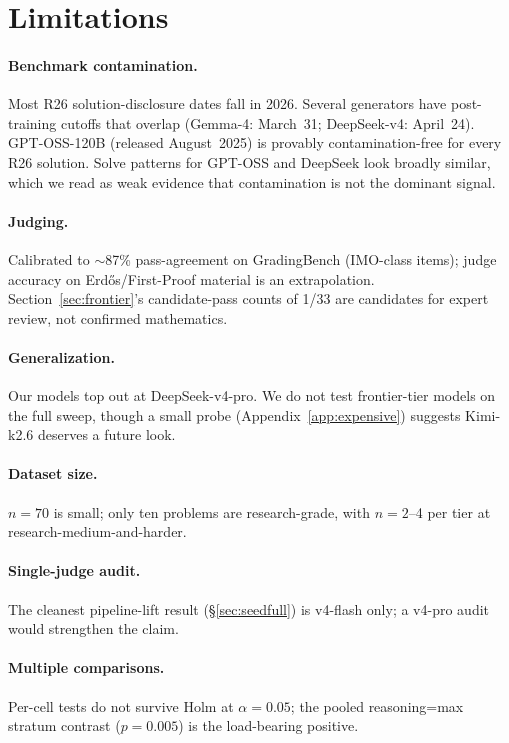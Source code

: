 \documentclass{article}
\begin{document}
\section{Limitations}
\label{sec:limitations}

\paragraph{Benchmark contamination.}
Most R26 solution-disclosure dates fall in 2026.
Several generators have post-training cutoffs that overlap (Gemma-4: March~31;
DeepSeek-v4: April~24).
GPT-OSS-120B (released August~2025) is provably contamination-free for every R26
solution.
Solve patterns for GPT-OSS and DeepSeek look broadly similar, which we read as
weak evidence that contamination is not the dominant signal.

\paragraph{Judging.}
Calibrated to $\sim$87\% pass-agreement on GradingBench (IMO-class items); judge
accuracy on Erd\H{o}s/First-Proof material is an extrapolation.
Section~\ref{sec:frontier}'s candidate-pass counts of 1/33 are candidates for
expert review, not confirmed mathematics.

\paragraph{Generalization.}
Our models top out at DeepSeek-v4-pro.
We do not test frontier-tier models on the full sweep, though a small probe
(Appendix~\ref{app:expensive}) suggests Kimi-k2.6 deserves a future look.

\paragraph{Dataset size.}
$n{=}70$ is small; only ten problems are research-grade, with $n{=}2$--4 per tier
at research-medium-and-harder.

\paragraph{Single-judge audit.}
The cleanest pipeline-lift result (\S\ref{sec:seedfull}) is v4-flash only; a v4-pro
audit would strengthen the claim.

\paragraph{Multiple comparisons.}
Per-cell tests do not survive Holm at $\alpha{=}0.05$; the pooled reasoning=max
stratum contrast ($p{=}0.005$) is the load-bearing positive.
\end{document}
